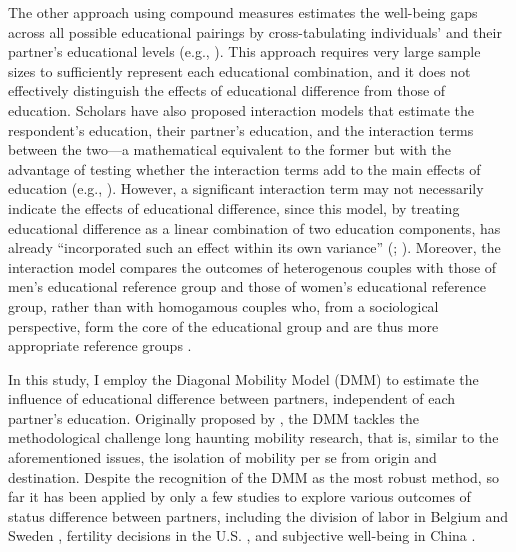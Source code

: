 The other approach using compound measures estimates the well-being gaps across all possible educational pairings by cross-tabulating individuals' and their partner's educational levels (e.g., \cite{jalovaaraJointEffectsMarriage2003}). This approach requires very large sample sizes to sufficiently represent each educational combination, and it does not effectively distinguish the effects of educational difference from those of education. Scholars have also proposed interaction models that estimate the respondent's education, their partner's education, and the interaction terms between the two—a mathematical equivalent to the former but with the advantage of testing whether the interaction terms add to the main effects of education (e.g., \cite{vannoyRelativeSocioeconomicStatus2001}). However, a significant interaction term may not necessarily indicate the effects of educational difference, since this model, by treating educational difference as a linear combination of two education components, has already “incorporated such an effect within its own variance” (\cite[p.332]{hopeModelsStatusInconsistency1975}; \cite{sobelDiagonalMobilityModels1981,sobelSocialMobilityFertility1985}). Moreover, the interaction model compares the outcomes of heterogenous couples with those of men's educational reference group and those of women's educational reference group, rather than with homogamous couples who, from a sociological perspective, form the core of the educational group and are thus more appropriate reference groups \parencite{sobelDiagonalMobilityModels1981,sobelSocialMobilityFertility1985}.

In this study, I employ the Diagonal Mobility Model (DMM) to estimate the influence of educational difference between partners, independent of each partner's education. Originally proposed by \textcite{sobelDiagonalMobilityModels1981}, the DMM tackles the methodological challenge long haunting mobility research, that is, similar to the aforementioned issues, the isolation of mobility per se from origin and destination. Despite the recognition of the DMM as the most robust method, so far it has been applied by only a few studies to explore various outcomes of status difference between partners, including the division of labor in Belgium and Sweden \parencite{eeckhautEducationalHeterogamyDivision2014}, fertility decisions in the U.S. \parencite{sorensonHusbandsWivesCharacteristics1989}, and subjective well-being in China \parencite{zhaoPartnersEducationalPairings2022}.


